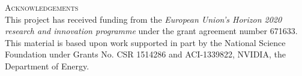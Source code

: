 \documentclass[a4paper,12pt]{article}
\begin{document}
\vspace{2em}


\noindent
\textsc{Acknowledgements}\\[1em] This project has received funding
from the \emph{European Union's Horizon 2020 research and innovation
  programme} under the grant agreement number 671633.  This material
is based upon work supported in part by the National Science
Foundation under Grants No. CSR 1514286 and ACI-1339822, NVIDIA, the
Department of Energy.

%

\newpage

\renewcommand{\contentsname}{Table of Contents}
\tableofcontents

\listoffigures



\newpage

%











\end{document}
